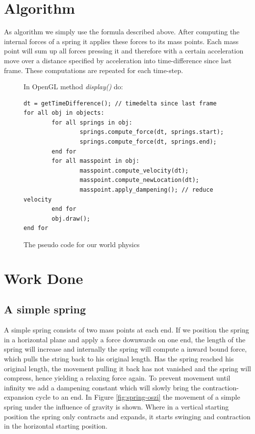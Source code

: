 \documentclass[11pt]{article}
\begin{document}
\section{Algorithm}
As algorithm we simply use the formula described above. After computing the internal forces of a spring it applies these forces to its mass points. Each mass point will sum up all forces pressing it and therefore with a certain acceleration move over a distance specified by acceleration into time-difference since last frame. These computations are repeated for each time-step.

\begin{figure}
\centering
In OpenGL method \textit{display()} do:
\begin{verbatim}
dt = getTimeDifference(); // timedelta since last frame
for all obj in objects:
        for all springs in obj:
                springs.compute_force(dt, springs.start);
                springs.compute_force(dt, springs.end);
        end for
        for all masspoint in obj:
                masspoint.compute_velocity(dt);
                masspoint.compute_newLocation(dt);
                masspoint.apply_dampening(); // reduce velocity
        end for
        obj.draw();
end for
\end{verbatim}
\caption{The pseudo code for our world physics}
\end{figure}

\section{Work Done}
\subsection{A simple spring}
A simple spring consists of two mass points at each end. If we position the spring in a horizontal plane and apply a force downwards on one end, the length of the spring will increase and internally the spring will compute a inward bound force, which pulls the string back to his original length. Has the spring reached his original length, the movement pulling it back has not vanished and the spring will compress, hence yielding a relaxing force again. To prevent movement until infinity we add a dampening constant which will slowly bring the contraction-expansion cycle to an end. In Figure \ref{fig:spring-oszi} the movement of a simple spring under the influence of gravity is shown. Where in a vertical starting position the spring only contracts and expands, it starts swinging and contraction in the horizontal starting position.
\end{document}
